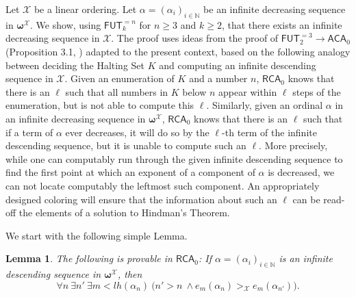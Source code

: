 \documentclass{amsart}
\newcommand\Nat{\mathbb{N}}
\newcommand\RCA{\mathsf{RCA}}
\newcommand\ACA{\mathsf{ACA}}
\newcommand\FUT{\mathsf{FUT}}
\newcommand{\LoX}{\mathcal{X}}
\newcommand\boldomega{\pmb{\omega}}
\newtheorem{lemma}{Lemma}
\begin{document}
Let $\LoX$ be a linear ordering. Let $\alpha=(\alpha_i)_{i \in \Nat}$ be an infinite decreasing sequence in 
$\boldomega^\LoX$. We show, using $\FUT^{=n}_k$ for $n \geq 3$ and $k \geq 2$, that there exists an infinite decreasing sequence in 
$\LoX$. 
The proof  uses ideas from the proof of $\FUT^{=3}_2 \to \ACA_0$ (Proposition 3.1, \cite{CKLZ:20}) adapted to the present context, based on the following analogy between deciding 
the Halting Set $K$ and computing an infinite descending sequence in $\LoX$. Given an enumeration of $K$ and a number $n$, $\RCA_0$ knows that there is an $\ell$ such that all numbers in $K$ below $n$ appear within $\ell$ steps of 
the enumeration, but is not able to compute this $\ell$. Similarly, given an ordinal $\alpha$ in an infinite decreasing sequence
in $\boldomega^\LoX$, $\RCA_0$ knows that there is an $\ell$ such that if a term of $\alpha$ ever decreases, it will do so 
by the $\ell$-th term of the infinite descending sequence, but it is unable to compute such an $\ell$. More precisely, 
while one can computably run through the given infinite descending sequence to find the first point at which an exponent 
of a component of $\alpha$ is decreased, we can not locate computably the leftmost such component. An appropriately 
designed coloring will ensure that the information about such an $\ell$ can be read-off the elements of a solution to 
Hindman's Theorem. 

We start with the following simple Lemma.%

\begin{lemma}\label{lem:decribile-terms} The following is provable in $\RCA_0$: If $\alpha=(\alpha_i)_{i\in\Nat}$ is an infinite descending sequence in $\boldomega^\LoX$, then
$$\forall n\ \exists n'\ \exists m < lh(\alpha_n) \ \big(n'>n \ \land e_m(\alpha_n) >_{\LoX} e_m(\alpha_{n'})\big).$$
\end{lemma}
\end{document}
